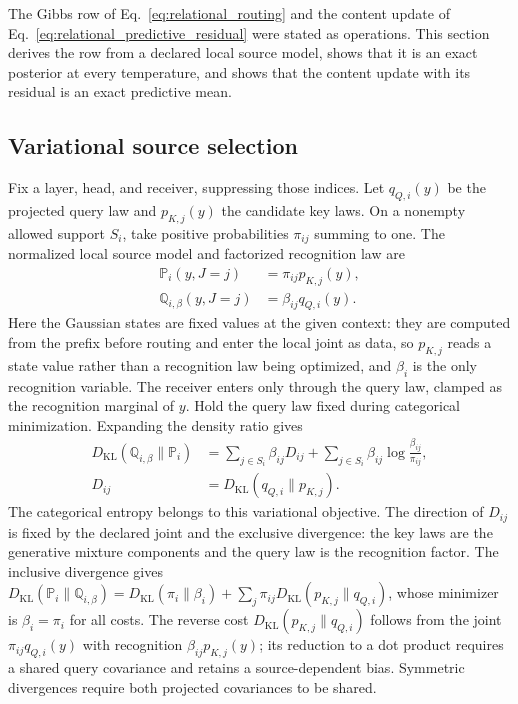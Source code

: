 \documentclass[twoside,11pt]{article}
\begin{document}
The Gibbs row of Eq.~\eqref{eq:relational_routing} and the content update of Eq.~\eqref{eq:relational_predictive_residual} were stated as operations. This section derives the row from a declared local source model, shows that it is an exact posterior at every temperature, and shows that the content update with its residual is an exact predictive mean.

\subsection{Variational source selection}
\label{sec:mixture_derivation}
Fix a layer, head, and receiver, suppressing those indices. Let $q_{Q,i}(y)$ be the projected query law and $p_{K,j}(y)$ the candidate key laws. On a nonempty allowed support $S_i$, take positive probabilities $\pi_{ij}$ summing to one. The normalized local source model and factorized recognition law are
\begin{align}
\mathbb P_i(y,J=j)&=\pi_{ij}p_{K,j}(y),\label{eq:mixture_joint}\\
\mathbb Q_{i,\beta}(y,J=j)&=\beta_{ij}q_{Q,i}(y).\label{eq:mixture_posterior}
\end{align}
Here the Gaussian states are fixed values at the given context: they are computed from the prefix before routing and enter the local joint as data, so $p_{K,j}$ reads a state value rather than a recognition law being optimized, and $\beta_i$ is the only recognition variable. The receiver enters only through the query law, clamped as the recognition marginal of $y$. Hold the query law fixed during categorical minimization. Expanding the density ratio gives
\begin{align}
D_{\mathrm{KL}}(\mathbb Q_{i,\beta}\|\mathbb P_i)
&=\sum_{j\in S_i}\beta_{ij}D_{ij}
+\sum_{j\in S_i}\beta_{ij}\log\frac{\beta_{ij}}{\pi_{ij}},
\label{eq:mixture_free_energy}\\
D_{ij}&=D_{\mathrm{KL}}(q_{Q,i}\|p_{K,j}).
\label{eq:mixture_energy_entropy}
\end{align}
The categorical entropy belongs to this variational objective. The direction of $D_{ij}$ is fixed by the declared joint and the exclusive divergence: the key laws are the generative mixture components and the query law is the recognition factor. The inclusive divergence gives $D_{\mathrm{KL}}(\mathbb P_i\|\mathbb Q_{i,\beta})=D_{\mathrm{KL}}(\pi_i\|\beta_i)+\sum_j\pi_{ij}D_{\mathrm{KL}}(p_{K,j}\|q_{Q,i})$, whose minimizer is $\beta_i=\pi_i$ for all costs. The reverse cost $D_{\mathrm{KL}}(p_{K,j}\|q_{Q,i})$ follows from the joint $\pi_{ij}q_{Q,i}(y)$ with recognition $\beta_{ij}p_{K,j}(y)$; its reduction to a dot product requires a shared query covariance and retains a source-dependent bias. Symmetric divergences require both projected covariances to be shared.
\end{document}
